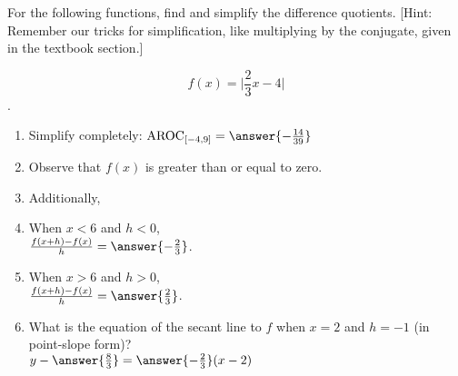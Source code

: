 \documentclass{ximera}
\author{Elizabeth Campolongo}
\begin{document}
\begin{exercise}

For the following functions, 
find and simplify the difference quotients. [Hint: Remember our tricks for simplification, like multiplying by the conjugate, given in the textbook section.]

$$f(x)= \Big|\frac{2}{3}x-4\Big|$$.

\begin{enumerate}

\item Simplify completely:
$\av_{[-4,9]} = \answer{-\frac{14}{39}}$
\item Observe that $f(x)$ is  greater than or equal to zero.
\item Additionally,
\begin{multipleChoice}
\end{multipleChoice}

\item When $x<6$ and $h<0$,\\
$\frac{f(x+h)-f(x)}{h} = \answer{-\frac{2}{3}}$.  

\item When $x>6$ and $h>0$,\\
$\frac{f(x+h)-f(x)}{h} = \answer{\frac{2}{3}}$.  

\item What is the equation of the secant line to $f$ when $x = 2$ and $h=-1$ (in point-slope form)?\\
$y-\answer{\frac{8}{3}}= \answer{-\frac{2}{3}}(x-2)$

\end{enumerate}
\end{exercise}
\end{document}
